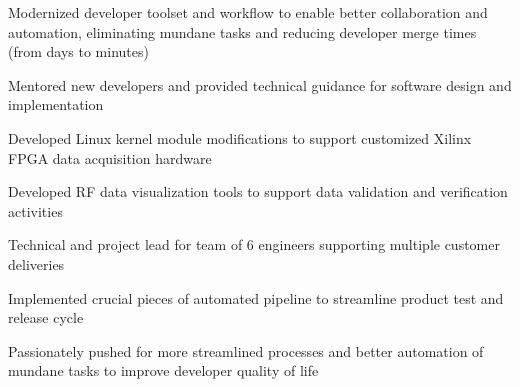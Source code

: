 \documentclass[letterpaper]{deedy-resume}
\newcommand{\experiencespace}{\vspace{2ex}}
\begin{document}
\begin{minipage}[t]{0.70\textwidth}
    \begin{compactitem}
        \item Modernized developer toolset and workflow to enable better collaboration and automation,
            eliminating mundane tasks and reducing developer merge times (from days to minutes)
        \item Mentored new developers and provided technical guidance for software design and implementation
        \item Developed Linux kernel module modifications to support customized Xilinx FPGA data acquisition
            hardware
        \item Developed RF data visualization tools to support data validation and verification activities
    \end{compactitem}
    \experiencespace

    \begin{compactitem}
        \item Technical and project lead for team of 6 engineers supporting multiple customer deliveries
        \item Implemented crucial pieces of automated pipeline to streamline product test and release cycle
        \item Passionately pushed for more streamlined processes and better automation of mundane tasks to
            improve developer quality of life
    \end{compactitem}
    \experiencespace


\end{minipage}
\end{document}
